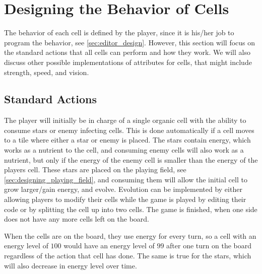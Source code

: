 \section{Designing the Behavior of Cells}
\label{sec:designingBehaviorCells}

The behavior of each cell is defined by the player, since it is his/her job to program the behavior, see \autoref{sec:editor_design}.
However, this section will focus on the standard actions that all cells can perform and how they work.
We will also discuss other possible implementations of attributes for cells, that might include strength, speed, and vision.

\subsection{Standard Actions}

The player will initially be in charge of a single organic cell with the ability to consume stars or enemy infecting cells.
This is done automatically if a cell moves to a tile where either a star or enemy is placed.
The stars contain energy, which works as a nutrient to the cell, and consuming enemy cells will also work as a nutrient, but only if the energy of the enemy cell is smaller than the energy of the players cell.
These stars are placed on the playing field, see \autoref{sec:designing_playing_field}, and consuming them will allow the initial cell to grow larger/gain energy, and evolve.
Evolution can be implemented by either allowing players to modify their cells while the game is played by editing their code or by splitting the cell up into two cells.
The game is finished, when one side does not have any more cells left on the board.\newline

When the cells are on the board, they use energy for every turn, so a cell with an energy level of $100$ would have an energy level of $99$ after one turn on the board regardless of the action that cell has done. The same is true for the stars, which will also decrease in energy level over time.\newline

